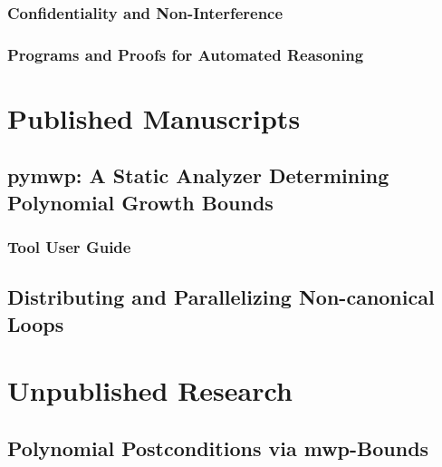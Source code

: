         \subsection{Confidentiality and Non-Interference}
        \label{pl-sec}
        

        \subsection{Programs and Proofs for Automated Reasoning}
        \label{verification}
        

\chapter{Published Manuscripts}\label{published-manuscripts}
\clearpage

    \section{pymwp: A Static Analyzer Determining Polynomial Growth Bounds}
    \label{sec:atva}
    
    \clearpage

    \subsection{Tool User Guide}
    \label{app:toolguide}
    
    \clearpage

    \section{Distributing and Parallelizing Non-canonical Loops}
    \label{sec:vmcai}
    
    \clearpage

\chapter{Unpublished Research}\label{ch:unpublished-research}
\clearpage

    \section{Polynomial Postconditions via mwp-Bounds}\label{sec:postcond}
    
    \clearpage

